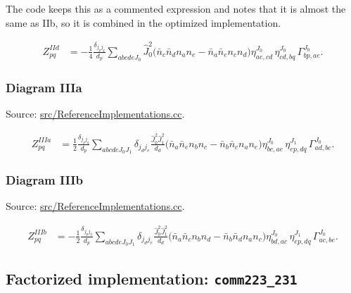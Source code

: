 \documentclass[
]{article}
\begin{document}
The code keeps this as a commented expression and notes that it is
almost the same as IIb, so it is combined in the optimized
implementation.

\begin{equation}
\begin{aligned}
Z^{IId}_{pq}
&=-\frac{1}{4}\frac{\delta_{j_pj_q}}{d_p}
\sum_{abcdeJ_0}
\hat J_0^2
\Big(\bar n_c\bar n_d n_a n_e-\bar n_a\bar n_e n_c n_d\Big)
\eta^{J_0}_{ae,cd}\,
\eta^{J_0}_{cd,bq}\,
\Gamma^{J_0}_{bp,ae} .
\end{aligned}
\end{equation}

\subsubsection{Diagram IIIa}\label{diagram-iiia}

Source:
\href{../src/ReferenceImplementations.cc\#L7171-L7256}{src/ReferenceImplementations.cc}.

\begin{equation}
\begin{aligned}
Z^{IIIa}_{pq}
&=\frac{1}{2}\frac{\delta_{j_pj_q}}{d_p}
\sum_{abcdeJ_0J_1}\delta_{j_dj_e}
\frac{\hat J_0^2\hat J_1^2}{d_d}
\Big(\bar n_a\bar n_e n_b n_c-\bar n_b\bar n_c n_a n_e\Big)
\eta^{J_0}_{bc,ae}\,
\eta^{J_1}_{ep,dq}\,
\Gamma^{J_0}_{ad,bc} .
\end{aligned}
\end{equation}

\subsubsection{Diagram IIIb}\label{diagram-iiib}

Source:
\href{../src/ReferenceImplementations.cc\#L7262-L7352}{src/ReferenceImplementations.cc}.

\begin{equation}
\begin{aligned}
Z^{IIIb}_{pq}
&=-\frac{1}{2}\frac{\delta_{j_pj_q}}{d_p}
\sum_{abcdeJ_0J_1}\delta_{j_dj_e}
\frac{\hat J_0^2\hat J_1^2}{d_d}
\Big(\bar n_a\bar n_c n_b n_d-\bar n_b\bar n_d n_a n_c\Big)
\eta^{J_0}_{bd,ac}\,
\eta^{J_1}_{ep,dq}\,
\Gamma^{J_0}_{ac,be} .
\end{aligned}
\end{equation}

\subsection{\texorpdfstring{Factorized implementation:
\texttt{comm223\_231}}{Factorized implementation: comm223\_231}}\label{factorized-implementation-comm223_231}
\end{document}

